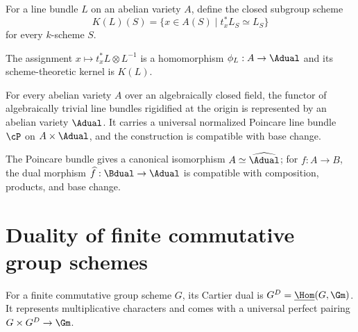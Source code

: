 \begin{definition}
\label{mumford-def-KL}
For a line bundle $L$ on an abelian variety $A$, define the closed subgroup
scheme
\[
 K(L)(S)=\{x\in A(S)\mid t_x^*L_S\simeq L_S\}
\]
for every $k$-scheme $S$.
\notready
\end{definition}

\begin{proposition}
\label{mumford-prop-phi-L}
The assignment $x\mapsto t_x^*L\otimes L^{-1}$ is a homomorphism
$\phi_L:A\to\Adual$ and its scheme-theoretic kernel is $K(L)$.
\notready
\end{proposition}

\begin{theorem}
\label{mumford-thm-dual-any-characteristic}
For every abelian variety $A$ over an algebraically closed field, the functor
of algebraically trivial line bundles rigidified at the origin is represented
by an abelian variety $\Adual$.  It carries a universal normalized Poincare line
bundle $\cP$ on $A\times\Adual$, and the construction is compatible with base
change.
\notready
\end{theorem}

\begin{proposition}
\label{mumford-prop-biduality-any-characteristic}
The Poincare bundle gives a canonical isomorphism $A\simeq\widehat{\Adual}$;
for $f:A\to B$, the dual morphism $\widehat f:\Bdual\to\Adual$ is compatible
with composition, products, and base change.
\notready
\end{proposition}

\section[Cartier duality]{Duality of finite commutative group schemes}
\label{mumford-III14}

\begin{definition}
\label{mumford-def-cartier-dual}
For a finite commutative group scheme $G$, its Cartier dual is
$G^D=\underline{\Hom}(G,\Gm)$.  It represents multiplicative characters and
comes with a universal perfect pairing $G\times G^D\to\Gm$.
\notready
\end{definition}

